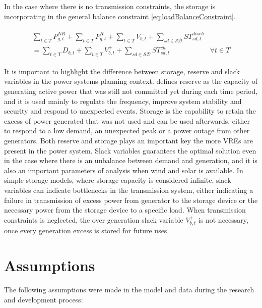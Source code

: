 \documentclass[12pt,LUDisStyle,twosided]{book}
\newcommand{\mc}{\mathcal}
\begin{document}
In the case where there is no transmission constraints, the storage is incorporating in the general balance constraint \eqref{eq:loadBalanceConstraint}.

\begin{subequations}
\begin{align}
\begin{split}
\sum_{t \in T} P^{NR}_{g,t} + \sum_{t \in T} P^{R}_{g,t} + \sum_{t \in T}V^{-}_{b,t} + \sum_{sd \in \mc{SD}} ST^{disch}_{sd,t} &
\\ = \sum_{t \in T} D_{b,t}  + \sum_{t \in T}V^{+}_{b,t} + \sum_{sd \in \mc{SD}} ST^{ch}_{sd,t} & \forall t \in T  \label{eq:loadBalanceConstraintStorage}
\end{split}
\end{align} 
\end{subequations}

It is important to highlight the difference between storage, reserve and slack variables in the power systems planning context.  \citeauthor{rebours} \cite{rebours} defines reserve as the capacity of generating active power that was still not committed yet during each time period, and it is used mainly to regulate the frequency, improve system stability and security and respond to unexpected events. Storage is the capability to retain the excess of power generated that was not used and can be used afterwards, either to respond to a low demand, an unexpected peak or a power outage from other generators. Both reserve and storage plays an important key the more VREs are present in the power system. Slack variables guarantees the optimal solution even in the case where there is an unbalance between demand and generation, and it is also an important parameters of analysis when wind and solar is available. In simple storage models, where storage capacity is considered infinite, slack variables can indicate bottlenecks in the transmission system, either indicating a failure in transmission of excess power from generator to the storage device or the necessary power from the storage device to a specific load. When transmission constraints is neglected, the over generation slack variable $V^{+}_{b,t}$ is not necessary, once every generation excess is stored for future uses.



\section{Assumptions}

The following assumptions were made in the model and data during the research and development process:
\end{document}
